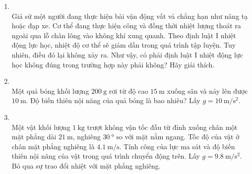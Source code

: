 \begin{enumerate}[label=\bfseries Câu \arabic*:, leftmargin=1.7cm]
\item {}\\
Giả sử một người đang thực hiện bài vận động vất vả chẳng hạn như nâng tạ hoặc đạp xe. Cơ thể đang thực hiện công và đồng thời nhiệt lượng thoát ra ngoài qua lỗ chân lông vào không khí xung quanh. Theo định luật I nhiệt động lực học, nhiệt độ cơ thể sẽ giảm dần trong quá trình tập luyện. Tuy nhiên, điều đó lại không xảy ra. Như vậy, có phải định luật I nhiệt động lực học không đúng trong trường hợp này phải không? Hãy giải thích.

\item {}\\
Một quả bóng khối lượng $\SI{200}{\gram}$ rơi từ độ cao $\SI{15}{\meter}$ xuống sân và nảy lên được $\SI{10}{\meter}$. Độ biến thiên nội năng của quả bóng là bao nhiêu? Lấy $g=\SI{10}{\meter/\second^2}$.


\item {}\\
Một vật khối lượng $\SI{1}{\kilogram}$ trượt không vận tốc đầu từ đỉnh xuống chân một mặt phẳng dài $\SI{21}{\meter}$, nghiêng $\SI{30}{\degree}$ so với mặt nằm ngang. Tốc độ của vật ở chân mặt phẳng nghiêng là $\SI{4.1}{\meter/\second}$. Tính công của lực ma sát và độ biến thiên nội năng của vật trong quá trình chuyển động trên. Lấy $g=\SI{9.8}{\meter/\second^2}$. Bỏ qua sự trao đổi nhiệt với mặt phẳng nghiêng.
\end{enumerate}






